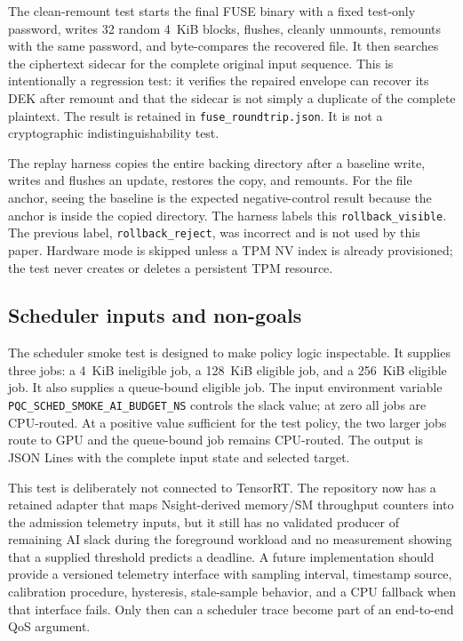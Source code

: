 The clean-remount test starts the final FUSE binary with a fixed test-only password, writes 32 random 4~KiB blocks, flushes, cleanly unmounts, remounts with the same password, and byte-compares the recovered file.  It then searches the ciphertext sidecar for the complete original input sequence.  This is intentionally a regression test: it verifies the repaired envelope can recover its DEK after remount and that the sidecar is not simply a duplicate of the complete plaintext.  The result is retained in \nolinkurl{fuse_roundtrip.json}.  It is not a cryptographic indistinguishability test.

The replay harness copies the entire backing directory after a baseline write, writes and flushes an update, restores the copy, and remounts.  For the file anchor, seeing the baseline is the expected negative-control result because the anchor is inside the copied directory.  The harness labels this \texttt{rollback\_visible}.  The previous label, \texttt{rollback\_reject}, was incorrect and is not used by this paper.  Hardware mode is skipped unless a TPM NV index is already provisioned; the test never creates or deletes a persistent TPM resource.

\subsection{Scheduler inputs and non-goals}
\label{sec:app_traffic}

The scheduler smoke test is designed to make policy logic inspectable.  It supplies three jobs: a 4~KiB ineligible job, a 128~KiB eligible job, and a 256~KiB eligible job.  It also supplies a queue-bound eligible job.  The input environment variable \texttt{PQC\_SCHED\_SMOKE\_AI\_BUDGET\_NS} controls the slack value; at zero all jobs are CPU-routed.  At a positive value sufficient for the test policy, the two larger jobs route to GPU and the queue-bound job remains CPU-routed.  The output is JSON Lines with the complete input state and selected target.

This test is deliberately not connected to TensorRT.  The repository now has a retained adapter that maps Nsight-derived memory/SM throughput counters into the admission telemetry inputs, but it still has no validated producer of remaining AI slack during the foreground workload and no measurement showing that a supplied threshold predicts a deadline.  A future implementation should provide a versioned telemetry interface with sampling interval, timestamp source, calibration procedure, hysteresis, stale-sample behavior, and a CPU fallback when that interface fails.  Only then can a scheduler trace become part of an end-to-end QoS argument.

